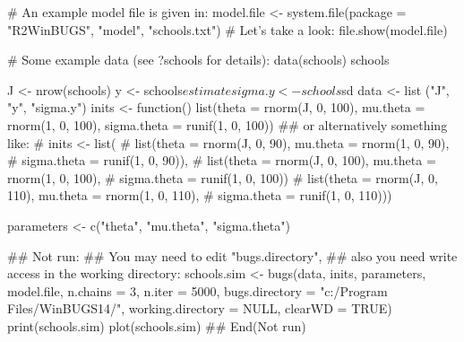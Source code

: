 \begin{Examples}
\begin{ExampleCode}
# An example model file is given in:
model.file <- system.file(package = "R2WinBUGS", "model", "schools.txt")
# Let's take a look:
file.show(model.file)






# Some example data (see ?schools for details):
data(schools)
schools

J <- nrow(schools)
y <- schools$estimate
sigma.y <- schools$sd
data <- list ("J", "y", "sigma.y")
inits <- function(){
    list(theta = rnorm(J, 0, 100), mu.theta = rnorm(1, 0, 100),
         sigma.theta = runif(1, 0, 100))
}
## or alternatively something like:
# inits <- list(
#   list(theta = rnorm(J, 0, 90), mu.theta = rnorm(1, 0, 90),
#        sigma.theta = runif(1, 0, 90)),
#   list(theta = rnorm(J, 0, 100), mu.theta = rnorm(1, 0, 100),
#        sigma.theta = runif(1, 0, 100))
#   list(theta = rnorm(J, 0, 110), mu.theta = rnorm(1, 0, 110),
#        sigma.theta = runif(1, 0, 110)))

parameters <- c("theta", "mu.theta", "sigma.theta")

## Not run:
## You may need to edit "bugs.directory",
## also you need write access in the working directory:
schools.sim <- bugs(data, inits, parameters, model.file,
    n.chains = 3, n.iter = 5000,
    bugs.directory = "c:/Program Files/WinBUGS14/",
    working.directory = NULL, clearWD = TRUE)
print(schools.sim)
plot(schools.sim)
## End(Not run)
\end{ExampleCode}
\end{Examples}


